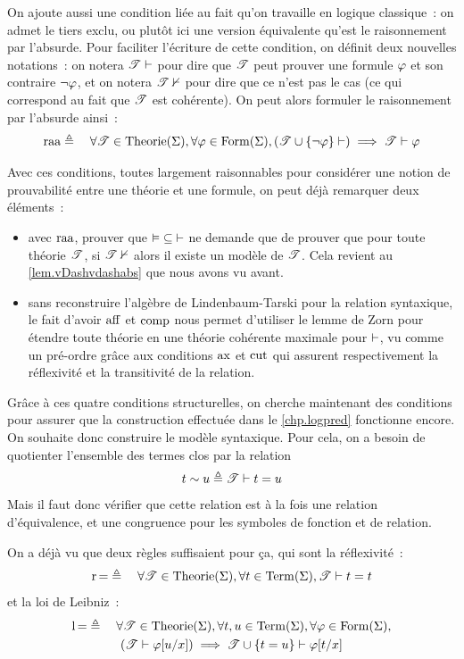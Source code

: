 On ajoute aussi une condition liée au fait qu'on travaille en logique
classique~: on admet le tiers exclu, ou plutôt ici une version équivalente
qu'est le raisonnement par l'absurde. Pour faciliter l'écriture de cette
condition, on définit deux nouvelles notations~: on notera $\mathscr T \vdash$ pour
dire que $\mathscr T$ peut prouver une formule $\varphi$ et son contraire
$\lnot\varphi$, et on notera $\mathscr T\nvdash$ pour dire que ce n'est pas le cas (ce
qui correspond au fait que $\mathscr T$ est cohérente). On peut alors formuler le
raisonnement par l'absurde ainsi~:
\[
\operatorname{raa} \triangleq\quad \forall \mathscr T\in\operatorname{Theorie}(\Sigma),\forall
\varphi\in\operatorname{Form}(\Sigma), (\mathscr T\cup\{\lnot\varphi\}\vdash)\implies \mathscr T\vdash\varphi
\]

Avec ces conditions, toutes largement raisonnables pour considérer une notion de
prouvabilité entre une théorie et une formule, on peut déjà remarquer deux
éléments~:
\begin{itemize}
\item avec $\operatorname{raa}$, prouver que $\mathord{\vDash}\subseteq \mathord{\vdash}$ ne
  demande que de prouver que pour toute théorie $\mathscr T$, si $\mathscr T\nvdash$ alors
  il existe un modèle de $\mathscr T$. Cela revient au \cref{lem.vDashvdashabs} que
  nous avons vu avant.
\item sans reconstruire l'algèbre de Lindenbaum-Tarski pour la relation
  syntaxique, le fait d'avoir $\operatorname{aff}$ et $\operatorname{comp}$ nous permet d'utiliser le
  lemme de Zorn pour étendre toute théorie en une théorie cohérente maximale
  pour $\vdash$, vu comme un pré-ordre grâce aux conditions $\operatorname{ax}$ et $\operatorname{cut}$ qui
  assurent respectivement la réflexivité et la transitivité de la relation.
\end{itemize}

Grâce à ces quatre conditions structurelles, on cherche maintenant des
conditions pour assurer que la construction effectuée dans le \cref{chp.logpred}
fonctionne encore. On souhaite donc construire le modèle syntaxique. Pour cela,
on a besoin de quotienter l'ensemble des termes clos par la relation
\[t \sim u \triangleq \mathscr T \vdash t = u\]
Mais il faut donc vérifier que cette relation est à la fois une relation
d'équivalence, et une congruence pour les symboles de fonction et de relation.

On a déjà vu que deux règles suffisaient pour ça, qui sont la réflexivité~:
\[\operatorname{r}\mathord{=} \triangleq \quad \forall \mathscr T\in\operatorname{Theorie}(\Sigma), \forall t\in\operatorname{Term}(\Sigma),
\mathscr T\vdash t = t
\]
et la loi de Leibniz~:
\begin{multline*}
\operatorname{l}{\mathord{=}} \triangleq \quad \forall \mathscr T\in\operatorname{Theorie}(\Sigma), \forall t,u\in\operatorname{Term}(\Sigma),
\forall \varphi\in\operatorname{Form}(\Sigma), \\
(\mathscr T\vdash\varphi[u/x]) \implies \mathscr T\cup\{t = u\}\vdash\varphi[t/x]
\end{multline*}

